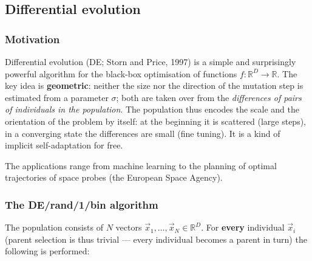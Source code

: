 \documentclass[11pt,a4paper]{article}
\theoremstyle{definition}
\begin{document}
\subsection{Differential evolution}
\label{sec:de}
\subsubsection{Motivation}

Differential evolution (DE; Storn and Price, 1997) is a simple and surprisingly
powerful algorithm for the black-box optimisation of functions
$f: \mathbb{R}^D \to \mathbb{R}$. The key idea is \textbf{geometric}: neither
the size nor the direction of the mutation step is estimated from a parameter
$\sigma$; both are taken over from the \emph{differences of pairs of individuals
in the population}. The population thus encodes the scale and the orientation of
the problem by itself: at the beginning it is scattered (large steps), in a
converging state the differences are small (fine tuning). It is a kind of
implicit self-adaptation for free.

The applications range from machine learning to the planning of optimal
trajectories of space probes (the European Space Agency).

\subsubsection{The DE/rand/1/bin algorithm}

The population consists of $N$ vectors
$\vec x_{1},\dots,\vec x_{N} \in \mathbb{R}^D$. For \textbf{every} individual
$\vec x_i$ (parent selection is thus trivial --- every individual becomes a
parent in turn) the following is performed:
\end{document}
